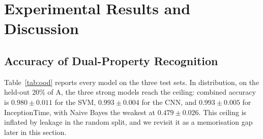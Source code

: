 \documentclass[journal]{IEEEtran}
\begin{document}

%


%
\section{Experimental Results and Discussion}
\label{Results_Discussion}

\subsection{Accuracy of Dual-Property Recognition}

Table~\ref{tab:ood} reports every model on the three test sets. In distribution,
on the held-out 20\% of A, the three strong models reach the ceiling: combined
accuracy is $0.980 \pm 0.011$ for the SVM, $0.993 \pm 0.004$ for the CNN, and
$0.993 \pm 0.005$ for InceptionTime, with Naive Bayes the weakest at
$0.479 \pm 0.026$. This ceiling is inflated by leakage in the random split, and we
revisit it as a memorisation gap later in this section.
\end{document}

